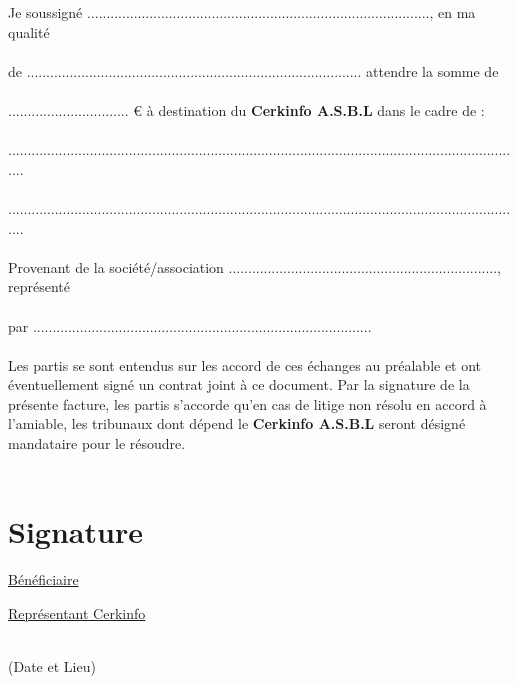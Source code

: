 \documentclass{article}
\begin{document}
\large{Je soussigné ........................................................................................, en ma qualité \\\\ de ...................................................................................... attendre la somme de \\\\ ............................... € à destination du \textbf{Cerkinfo A.S.B.L} dans le cadre de : \\\\
.....................................................................................................................................\\\\
.....................................................................................................................................
\\\\
Provenant de la société/association ....................................................................., représenté \\\\
par ....................................................................................... \\\\
Les partis se sont entendus sur les accord de ces échanges au préalable et ont éventuellement signé un contrat joint à ce document. Par la signature de la présente facture, les partis s'accorde qu'en cas de litige non résolu en accord à l'amiable, les tribunaux dont dépend le \textbf{Cerkinfo A.S.B.L} seront désigné mandataire pour le résoudre. 
}
\\\\
\begin{minipage}{0.4\textwidth}
\section*{Signature}
\end{minipage}
\begin{minipage}{0.4\textwidth}
\underline{Bénéficiaire}
\end{minipage}
\begin{minipage}{0.4\textwidth}
\underline{Représentant Cerkinfo}
\end{minipage}
\\
(Date et Lieu)
\end{document}

